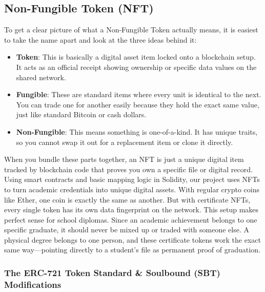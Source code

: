 \subsection{Non-Fungible Token (NFT)}

To get a clear picture of what a Non-Fungible Token actually means, it is easiest to take the name apart and look at the three ideas behind it:

\begin{itemize}
    \item \textbf{Token}: This is basically a digital asset item locked onto a blockchain setup. It acts as an official receipt showing ownership or specific data values on the shared network\cite{nakamoto2008bitcoin}\cite{wood2008EthereumYellowPaper}.

    \item \textbf{Fungible}: These are standard items where every unit is identical to the next. You can trade one for another easily because they hold the exact same value, just like standard Bitcoin or cash dollars\cite{nakamoto2008bitcoin}\cite{wood2008EthereumYellowPaper}.

    \item \textbf{Non-Fungible}: This means something is one-of-a-kind. It has unique traits, so you cannot swap it out for a replacement item or clone it directly\cite{william2018eip721}.
\end{itemize}

When you bundle these parts together, an NFT is just a unique digital item tracked by blockchain code that proves you own a specific file or digital record.\\

Using smart contracts and basic mapping logic in Solidity\cite{wood2008EthereumYellowPaper}, our project uses NFTs to turn academic credentials into unique digital assets\cite{ahsan2025shikkachain}. With regular crypto coins like Ether, one coin is exactly the same as another. But with certificate NFTs, every single token has its own data fingerprint on the network\cite{nfterc721web}\cite{william2018eip721}. This setup makes perfect sense for school diplomas. Since an academic achievement belongs to one specific graduate, it should never be mixed up or traded with someone else. A physical degree belongs to one person, and these certificate tokens work the exact same way—pointing directly to a student's file as permanent proof of graduation\cite{glen2022web3soul}\cite{ahsan2025shikkachain}.

\subsubsection{The ERC-721 Token Standard \& Soulbound (SBT) Modifications}

